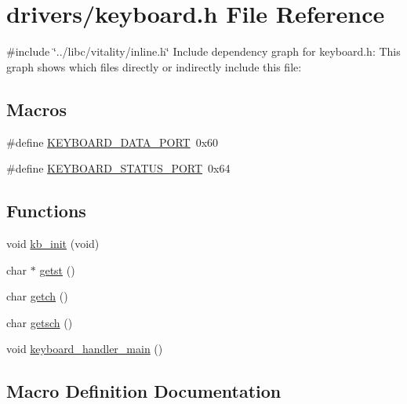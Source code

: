 \hypertarget{a00035}{}\section{drivers/keyboard.h File Reference}
\label{a00035}
{\ttfamily \#include \char`\"{}../libc/vitality/inline.\+h\char`\"{}}\newline
Include dependency graph for keyboard.\+h\+:
This graph shows which files directly or indirectly include this file\+:
\subsection*{Macros}
\begin{DoxyCompactItemize}
\item 
\#define \hyperlink{a00035_a49e0a04e81098085d2948c1e9f8c99cb_a49e0a04e81098085d2948c1e9f8c99cb}{K\+E\+Y\+B\+O\+A\+R\+D\+\_\+\+D\+A\+T\+A\+\_\+\+P\+O\+RT}~0x60
\item 
\#define \hyperlink{a00035_ab79ca089665bc7f5cc151883d1bc69ed_ab79ca089665bc7f5cc151883d1bc69ed}{K\+E\+Y\+B\+O\+A\+R\+D\+\_\+\+S\+T\+A\+T\+U\+S\+\_\+\+P\+O\+RT}~0x64
\end{DoxyCompactItemize}
\subsection*{Functions}
\begin{DoxyCompactItemize}
\item 
void \hyperlink{a00035_aabdb223e5290f3b3c07bc82d075b87d7_aabdb223e5290f3b3c07bc82d075b87d7}{kb\+\_\+init} (void)
\item 
char $\ast$ \hyperlink{a00035_ab88a2e96bbe585e228a5b201435c0240_ab88a2e96bbe585e228a5b201435c0240}{getst} ()
\item 
char \hyperlink{a00035_af3facad10e05defa48d45b46eb9ebe7e_af3facad10e05defa48d45b46eb9ebe7e}{getch} ()
\item 
char \hyperlink{a00035_aa7ee03b27a489828ce588d0fc023cab3_aa7ee03b27a489828ce588d0fc023cab3}{getsch} ()
\item 
void \hyperlink{a00035_adffe6abc4a32b3b10985ec9324bce2af_adffe6abc4a32b3b10985ec9324bce2af}{keyboard\+\_\+handler\+\_\+main} ()
\end{DoxyCompactItemize}


\subsection{Macro Definition Documentation}
\mbox{\label{a00035_a49e0a04e81098085d2948c1e9f8c99cb_a49e0a04e81098085d2948c1e9f8c99cb}} 
